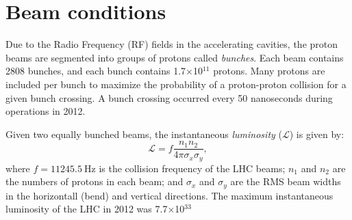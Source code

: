 \section{Beam conditions}
Due to the Radio Frequency (RF) fields in the accelerating cavities, the proton beams are segmented into groups of protons called \textit{bunches}. Each beam contains 2808 bunches, and each bunch contains 1.7$\times$10$^{11}$ protons. Many protons are included per bunch to maximize the probability of a proton-proton collision for a given bunch crossing. A bunch crossing occurred every 50 nanoseconds during operations in 2012.

Given two equally bunched beams, the instantaneous \textit{luminosity} ($\mathcal{L}$) is given by:
\begin{equation}\label{eqn:lumi}
  \mathcal{L} = f \frac{n_1 n_2}{4\pi \sigma_x\sigma_y},
\end{equation}
where $f=\SI{11245.5}{\hertz}$ is the collision frequency of the LHC beams; $n_{1}$ and $n_{2}$ are the numbers of protons in each beam; and $\sigma_{x}$ and $\sigma_{y}$ are the RMS beam widths in the horizontall (bend) and vertical directions.\cite{PDG} The maximum instantaneous luminosity of the LHC in 2012 was 7.7$\times$10$^{33}$

